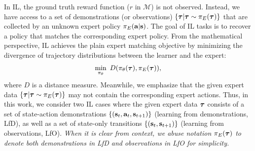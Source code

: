 In IL, the ground truth reward function (\ie $r$ in $\mathcal{M}$) is not observed. Instead, we have access to a set of demonstrations (or observations) $\{{\bm{\tau}}|{\bm{\tau}}\sim\pi_E({\bm{\tau}})\}$ that are collected by an unknown expert policy $\pi_E(\mathbf{a}|\mathbf{s})$. 
The goal of IL tasks is to recover a policy that matches the corresponding expert policy. From the mathematical perspective, IL achieves the plain expert matching objective by minimizing the divergence of trajectory distributions between the learner and the expert:  
\begin{align}\label{eq:min-il}
	\min_{\pi_\theta} \  D(\pi_\theta({\bm{\tau}}), \pi_E({\bm{\tau}})), 
\end{align}
where $D$ is a distance measure. 
Meanwhile, we emphasize that the given expert data $\{{\bm{\tau}}|{\bm{\tau}}\sim\pi_E({\bm{\tau}})\}$ may not contain the corresponding expert actions. Thus, in this work, we consider two IL cases where the given expert data ${\bm{\tau}}$ consists of a set of state-action demonstrations $\{(\mathbf{s}_t, \mathbf{a}_t, \mathbf{s}_{t+1})\}$ ({learning from demonstrations, {{LfD}}}), as well as a set of state-only transitions $\{(\mathbf{s}_t, \mathbf{s}_{t+1})\}$ ({learning from observations, {{LfO}}}). 
\textit{When it is clear from context, we abuse notation $\pi_E({\bm{\tau}})$ to denote both demonstrations in LfD and observations in LfO for simplicity.} 


